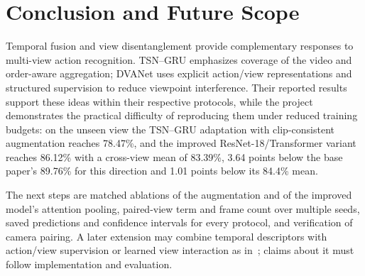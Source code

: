 \documentclass[runningheads]{llncs}
\begin{document}
\section{Conclusion and Future Scope}\label{sec:concl}
Temporal fusion and view disentanglement provide complementary responses to multi-view action recognition. TSN--GRU emphasizes coverage of the video and order-aware aggregation; DVANet uses explicit action/view representations and structured supervision to reduce viewpoint interference. Their reported results support these ideas within their respective protocols, while the project demonstrates the practical difficulty of reproducing them under reduced training budgets: on the unseen view the TSN--GRU adaptation with clip-consistent augmentation reaches 78.47\%, and the improved ResNet-18/Transformer variant reaches 86.12\% with a cross-view mean of 83.39\%, 3.64 points below the base paper's 89.76\% for this direction and 1.01 points below its 84.4\% mean.

The next steps are matched ablations of the augmentation and of the improved model's attention pooling, paired-view term and frame count over multiple seeds, saved predictions and confidence intervals for every protocol, and verification of camera pairing. A later extension may combine temporal descriptors with action/view supervision or learned view interaction as in~\cite{cva,tbcnet}; claims about it must follow implementation and evaluation.
\end{document}

